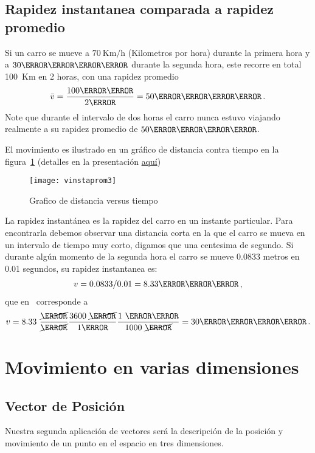 \subsection{Rapidez instantanea comparada a rapidez promedio}

Si un carro se mueve a $70\ \text{Km/h}$ (Kilometros por hora) durante la primera hora y a $30\kilo\meter\per\hour$
durante la segunda hora, este recorre en total 100~Km en 2 horas, con una rapidez promedio
\begin{align}
  \bar{v}=\frac{100\kilo\meter}{2\hour}=50\kilo\meter\per\hour\,.
\end{align}
Note que durante el intervalo de dos horas el carro nunca estuvo viajando realmente a su rapidez promedio de $50\kilo\meter\per\hour$.

El movimiento es ilustrado en un gráfico de distancia contra tiempo en la figura~\ref{fig:vinstaprom3} (detalles en la presentación \href{http://goo.gl/3eqUa}{aquí})

\begin{frame}[plain]
\begin{figure}
  \centering
  \texttt{[image: vinstaprom3]}
  \caption{Grafico de distancia versus tiempo}
  \label{fig:vinstaprom3}
\end{figure}
\end{frame}


La rapidez instantánea es la rapidez del carro en un instante particular. Para encontrarla debemos observar una distancia corta en la que el carro se mueva en un intervalo de tiempo muy corto, digamos que una centesima de segundo. Si durante algún momento de la segunda hora el carro se mueve 0.0833 metros en 0.01 segundos, su rapidez instantanea es:
\begin{align}
  v=0.0833/0.01=8.33 \meter\per\second\,,
\end{align}
que en \kilo\meter\per\hour\ corresponde a
\begin{align}
  v=8.33\ \frac{\cancel{\meter}}{\cancel{\second}}\frac{3600\ \cancel{\second}}{1\hour}\frac{1\ \kilo\meter}{1000\ \cancel{\meter}}=30\kilo\meter\per\hour\,.
\end{align}



\section{Movimiento en varias dimensiones}

\subsection{Vector de Posición}
Nuestra segunda aplicaci\'on de vectores ser\'a la descripci\'on  de la posici\'on y movimiento de un punto en el espacio en tres dimensiones. 


